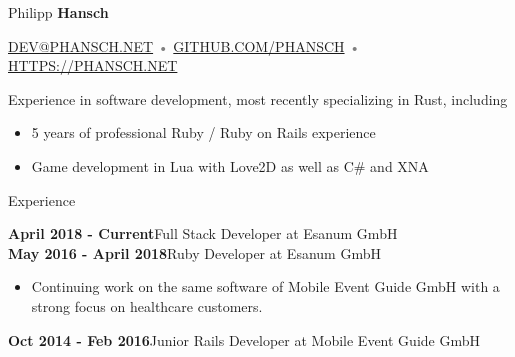 \documentclass[12pt]{article}
\begin{document}
\thispagestyle{empty}



{\Huge Philipp \textbf{Hansch}}

{\footnotesize
  \textcolor{Gray}{
    \href{mailto:dev@phansch.net}{\uppercase{dev@phansch.net}}
    •
    \href{https://github.com/phansch}{\uppercase{github.com/phansch}}
    •
    \href{https://phansch.net}{\uppercase{https://phansch.net}}
  }
}

\vspace{0.5cm}

Experience in software development, most recently specializing in Rust, including

\begin{itemize}
  \setlength{\itemsep}{0cm}
  \setlength{\parskip}{0cm}
  \item 5 years of professional Ruby / Ruby on Rails experience
  \item Game development in Lua with Love2D as well as C\# and XNA
\end{itemize}

{\Large Experience}

\textbf{April 2018 - Current}\hfill Full Stack Developer at Esanum GmbH
\\

\textbf{May 2016 - April 2018}\hfill Ruby Developer at Esanum GmbH

\begin{itemize}
  \setlength{\itemsep}{0cm}
  \setlength{\parskip}{0cm}

  \item Continuing work on the same software of Mobile Event Guide GmbH with a strong focus on healthcare customers.
\end{itemize}

\textbf{Oct 2014 - Feb 2016}\hfill Junior Rails Developer at Mobile Event Guide GmbH
\end{document}
